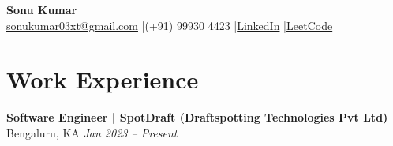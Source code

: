 \documentclass[a4paper,10pt]{article}
\begin{document}
\begin{center}
    {\Huge \textbf{Sonu Kumar}}\\[6pt]
    \href{mailto:sonukumar03xt@gmail.com}{sonukumar03xt@gmail.com}
    \quad|\quad (+91) 99930 4423
    \quad|\quad \href{https://www.linkedin.com/in/sonukumar03xt}{LinkedIn}
    \quad|\quad \href{https://leetcode.com/sonukumar03xt}{LeetCode}
\end{center}

\vspace{0.5em}

\section{Work Experience}

\textbf{Software Engineer | SpotDraft (Draftspotting Technologies Pvt Ltd)} \hfill Bengaluru, KA \quad \textit{Jan 2023 – Present}
\end{document}
